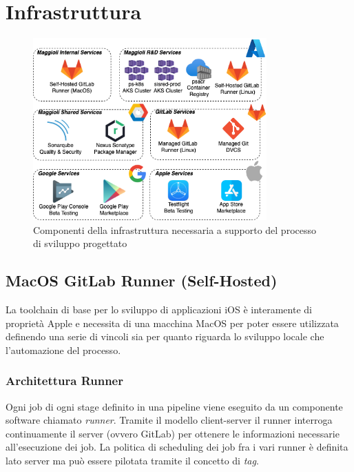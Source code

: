 \section{Infrastruttura}
\begin{figure}[H]
\centering
\includegraphics[width=0.8\textwidth]{img/tesi-3-infra.drawio.png}
\caption{Componenti della infrastruttura necessaria a supporto del processo di sviluppo progettato}
\end{figure}

\subsection{MacOS GitLab Runner (Self-Hosted)}
La toolchain di base per lo sviluppo di applicazioni iOS è interamente di proprietà Apple e necessita di una macchina MacOS per poter essere utilizzata definendo una serie di vincoli sia per quanto riguarda lo sviluppo locale che l'automazione del processo.
\subsubsection{Architettura Runner}
Ogni job di ogni stage definito in una pipeline viene eseguito da un componente software chiamato \textit{runner}. Tramite il modello client-server il runner interroga continuamente il server (ovvero GitLab) per ottenere le informazioni necessarie all'esecuzione dei job. La politica di scheduling dei job fra i vari runner è definita lato server ma può essere pilotata tramite il concetto di \textit{tag}.

